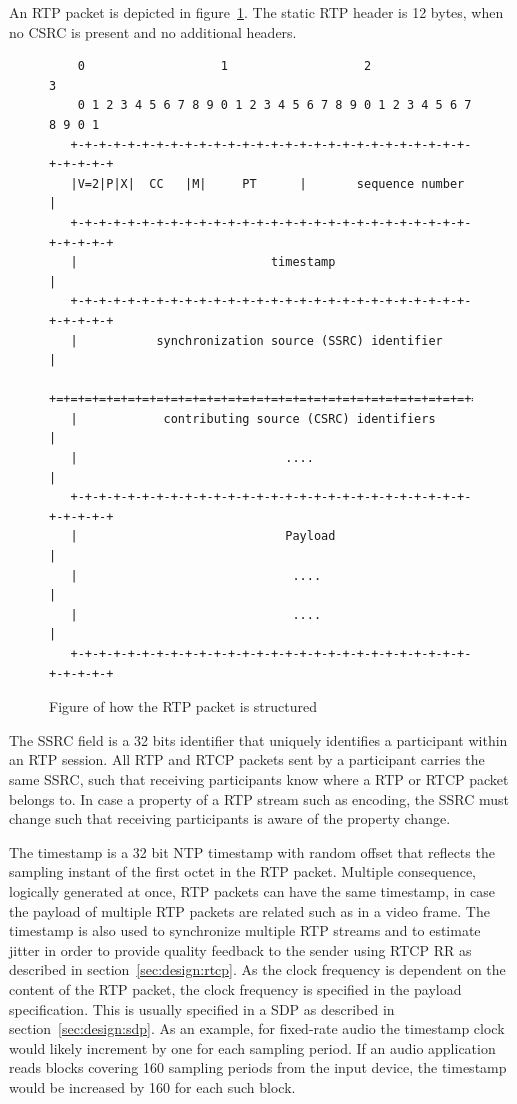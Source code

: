 An RTP packet is depicted in figure~\ref{fig:design:rtppacket}. The static RTP header is 12 bytes, when no CSRC is present and no additional headers.

\begin{figure}[H]
\centering
\begin{verbatim}
    0                   1                   2                   3
    0 1 2 3 4 5 6 7 8 9 0 1 2 3 4 5 6 7 8 9 0 1 2 3 4 5 6 7 8 9 0 1
   +-+-+-+-+-+-+-+-+-+-+-+-+-+-+-+-+-+-+-+-+-+-+-+-+-+-+-+-+-+-+-+-+
   |V=2|P|X|  CC   |M|     PT      |       sequence number         |
   +-+-+-+-+-+-+-+-+-+-+-+-+-+-+-+-+-+-+-+-+-+-+-+-+-+-+-+-+-+-+-+-+
   |                           timestamp                           |
   +-+-+-+-+-+-+-+-+-+-+-+-+-+-+-+-+-+-+-+-+-+-+-+-+-+-+-+-+-+-+-+-+
   |           synchronization source (SSRC) identifier            |
   +=+=+=+=+=+=+=+=+=+=+=+=+=+=+=+=+=+=+=+=+=+=+=+=+=+=+=+=+=+=+=+=+
   |            contributing source (CSRC) identifiers             |
   |                             ....                              |
   +-+-+-+-+-+-+-+-+-+-+-+-+-+-+-+-+-+-+-+-+-+-+-+-+-+-+-+-+-+-+-+-+
   |                             Payload                           |
   |                              ....                             |
   |                              ....                             |
   +-+-+-+-+-+-+-+-+-+-+-+-+-+-+-+-+-+-+-+-+-+-+-+-+-+-+-+-+-+-+-+-+
\end{verbatim}
\caption{Figure of how the RTP packet is structured\citep{RFC3550}}
\label{fig:design:rtppacket}
\end{figure}

The \ac{SSRC} field is a 32 bits identifier that uniquely identifies a participant within an RTP session. All RTP and RTCP packets sent by a participant carries the same SSRC, such that receiving participants know where a RTP or RTCP packet belongs to. In case a property of a RTP stream such as encoding, the SSRC must change such that receiving participants is aware of the property change.

The timestamp is a 32 bit NTP timestamp with random offset that reflects the sampling instant of the first octet in the RTP packet. Multiple consequence, logically generated at once, RTP packets can have the same timestamp, in case the payload of multiple RTP packets are related such as in a video frame.
The timestamp is also used to synchronize multiple RTP streams and to estimate jitter in order to provide quality feedback to the sender using RTCP RR as described in section~\ref{sec:design:rtcp}.
As the clock frequency is dependent on the content of the RTP packet, the clock frequency is specified in the payload specification. This is usually specified in a SDP as described in section~\ref{sec:design:sdp}. As an example, for fixed-rate audio the timestamp clock would likely increment by one for each sampling period. If an audio application reads blocks covering 160 sampling periods from the input device, the timestamp would be increased by 160 for each such block\citep{RFC3550}.

